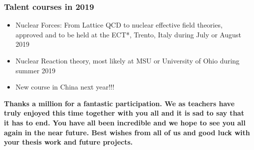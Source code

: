 \documentclass[compress]{beamer}
\begin{document}
\frame
{
  \frametitle{Talent courses in 2019}

\begin{itemize}
\item Nuclear Forces: From Lattice QCD to nuclear effective field theories, approved and to be held at the ECT*, Trento, Italy during  July or August 2019
\item Nuclear Reaction theory, most likely at MSU or University of Ohio during summer 2019
\item New course in China next year!!!
\end{itemize}

{\bf Thanks a million for a fantastic participation. We as teachers have truly enjoyed this time together with you all and it is sad to say that it has to end. You have all been incredible and we hope to see you all again in the near future. Best wishes from all of us and good luck with your thesis work and future projects. }

}





 
\end{document}
